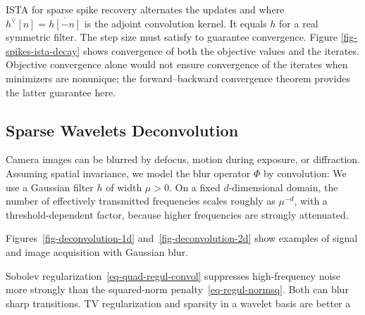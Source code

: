 ISTA for sparse spike recovery alternates the updates
and
where $h^\vee[n]=\overline{h[-n]}$ is the adjoint convolution kernel. It equals $h$ for a real symmetric filter. The step size must satisfy
to guarantee convergence. Figure \ref{fig-spikes-ista-decay} shows convergence of both the objective values and the iterates. Objective convergence alone would not ensure convergence of the iterates when minimizers are nonunique; the forward--backward convergence theorem provides the latter guarantee here.




                                                                
\subsection{Sparse Wavelets Deconvolution}


Camera images can be blurred by defocus, motion during exposure, or diffraction. Assuming spatial invariance, we model the blur operator $\Phi$ by convolution:
We use a Gaussian filter $h$ of width $\mu > 0$. On a fixed $d$-dimensional domain, the number of effectively transmitted frequencies scales roughly as $\mu^{-d}$, with a threshold-dependent factor, because higher frequencies are strongly attenuated.

Figures~\ref{fig-deconvolution-1d} and~\ref{fig-deconvolution-2d} show examples of signal and image acquisition with Gaussian blur.

Sobolev regularization~\eqref{eq-quad-regul-convol} suppresses high-frequency noise more strongly than the squared-norm penalty~\eqref{eq-regul-normsq}. Both can blur sharp transitions. TV regularization and sparsity in a wavelet basis are better a